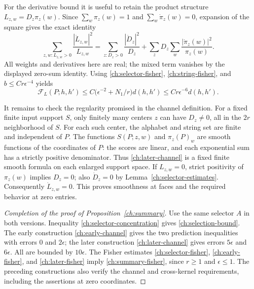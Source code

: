 For the derivative bound it is useful to retain the product structure
$L_{z,w}=D_z\pi_z(w)$.  Since $\sum_w\pi_z(w)=1$ and
$\sum_w\dot\pi_z(w)=0$, expansion of the square gives the exact identity
\begin{equation}
 \sum_{z,w:L_{z,w}>0}\frac{|\dot L_{z,w}|^2}{L_{z,w}}
 =\sum_{z:D_z>0}\frac{|\dot D_z|^2}{D_z}
   +\sum_zD_z\sum_w\frac{|\dot\pi_z(w)|^2}{\pi_z(w)}.
 \label{ch:product-fisher}
\end{equation}
All weights and derivatives here are real; the mixed term vanishes by the
displayed zero-sum identity.  Using \eqref{ch:selector-fisher},
\eqref{ch:string-fisher}, and $b\le Cr\epsilon^{-4}$ yields
\begin{equation}
 \mathcal F_L(P;h,h')
 \le C\bigl(\epsilon^{-2}+N_1/r\bigr)d(h,h')
 \le Cr\epsilon^{-6}d(h,h').
 \label{ch:later-fisher}
\end{equation}

It remains to check the regularity promised in the channel definition.
For a fixed finite input support $S$, only finitely many centers $z$ can
have $D_z\ne0$, all in the $2r$ neighborhood of $S$.  For each such
center, the alphabet and string set are finite and independent of $P$.
The functions $S(P;z,w)$ and $\pi_z(P)_w$ are smooth functions of the
coordinates of $P$: the scores are linear, and each exponential sum has a
strictly positive denominator.  Thus \eqref{ch:later-channel} is a fixed
finite smooth formula on each enlarged support space.  If $L_{z,w}=0$,
strict positivity of $\pi_z(w)$ implies $D_z=0$; also $\dot D_z=0$ by
Lemma~\ref{ch:selector-estimates}.  Consequently $\dot L_{z,w}=0$.
This proves smoothness at faces and the required behavior at zero entries.

\begin{proof}[Completion of the proof of Proposition~\ref{ch:summary}]
Use the same selector $A$ in both versions.  Inequality
\eqref{ch:selector-concentration} gives
\eqref{ch:selection-bound}.  The early construction
\eqref{ch:early-channel} gives the two prediction inequalities with
errors $0$ and $2\epsilon$; the later construction
\eqref{ch:later-channel} gives errors $5\epsilon$ and $6\epsilon$.
All are bounded by $10\epsilon$.
The Fisher estimates \eqref{ch:selector-fisher},
\eqref{ch:early-fisher}, and \eqref{ch:later-fisher} imply
\eqref{ch:summary-fisher}, since $r\ge1$ and $\epsilon\le1$.
The preceding constructions also verify the channel and cross-kernel
requirements, including the assertions at zero coordinates.
\end{proof}

